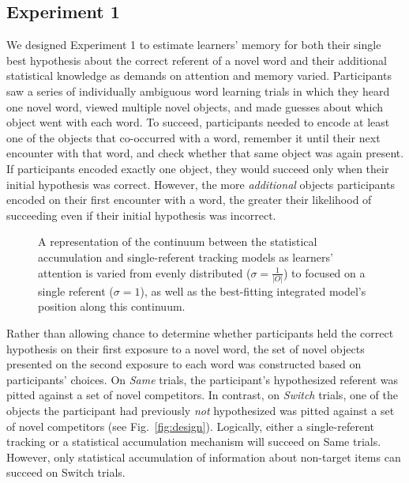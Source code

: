 \documentclass{pnastwo}
\begin{document}
\begin{article}
\section{Experiment 1}

We designed Experiment 1 to estimate learners' memory for both their single best hypothesis about the correct referent of a novel word and their additional statistical knowledge as demands on attention and memory varied. Participants saw a series of individually ambiguous word learning trials in which they heard one novel word, viewed multiple novel objects, and made guesses about which object went with each word. To succeed, participants needed to encode at least one of the objects that co-occurred with a word, remember it until their next encounter with that word, and check whether that same object was again present. If participants encoded exactly one object, they would succeed only when their initial hypothesis was correct. However, the more \emph{additional} objects participants encoded on their first encounter with a word, the greater their likelihood of succeeding even if their initial hypothesis was incorrect. 

 \begin{figure}[t]
	\caption{\label{fig:models} A representation of the continuum between the statistical accumulation and single-referent tracking models as learners' attention is varied from evenly distributed ($\sigma=\frac{1}{|O|}$) to focused on a single referent ($\sigma=1$), as well as the best-fitting integrated model's position along this continuum.}
\end{figure}

Rather than allowing chance to determine whether participants held the correct hypothesis on their first exposure to a novel word, the set of novel objects presented on the second exposure to each word was constructed based on participants' choices. On \emph{Same} trials, the participant's hypothesized referent was pitted against a set of novel competitors. In contrast, on \emph{Switch} trials, one of the objects the participant had previously \emph{not} hypothesized was pitted against a set of novel competitors (see Fig.~\ref{fig:design}). Logically, either a single-referent tracking or a statistical accumulation mechanism will succeed on Same trials. However, only statistical accumulation of information about non-target items can  succeed on Switch trials.


\end{article}
\end{document}
